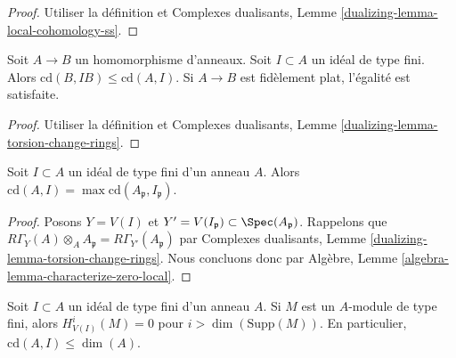 \begin{proof}
Utiliser la définition et Complexes dualisants, Lemme
\ref{dualizing-lemma-local-cohomology-ss}.
\end{proof}

\begin{lemma}
\label{lemma-cd-change-rings}
Soit $A \to B$ un homomorphisme d'anneaux. Soit $I \subset A$ un idéal de type fini.
Alors $\text{cd}(B, IB) \leq \text{cd}(A, I)$. Si $A \to B$ est fidèlement
plat, l'égalité est satisfaite.
\end{lemma}

\begin{proof}
Utiliser la définition et
Complexes dualisants, Lemme \ref{dualizing-lemma-torsion-change-rings}.
\end{proof}

\begin{lemma}
\label{lemma-cd-local}
Soit $I \subset A$ un idéal de type fini d'un anneau $A$.
Alors $\text{cd}(A, I) = \max \text{cd}(A_\mathfrak p, I_\mathfrak p)$.
\end{lemma}

\begin{proof}
Posons $Y = V(I)$ et $Y' = V(I_\mathfrak p) \subset \Spec(A_\mathfrak p)$.
Rappelons que
$R\Gamma_Y(A) \otimes_A A_\mathfrak p = R\Gamma_{Y'}(A_\mathfrak p)$
par Complexes dualisants, Lemme \ref{dualizing-lemma-torsion-change-rings}.
Nous concluons donc par Algèbre, Lemme \ref{algebra-lemma-characterize-zero-local}.
\end{proof}

\begin{lemma}
\label{lemma-cd-dimension}
Soit $I \subset A$ un idéal de type fini d'un anneau $A$.
Si $M$ est un $A$-module de type fini, alors
$H^i_{V(I)}(M) = 0$ pour $i > \dim(\text{Supp}(M))$.
En particulier, $\text{cd}(A, I) \leq \dim(A)$.
\end{lemma}

